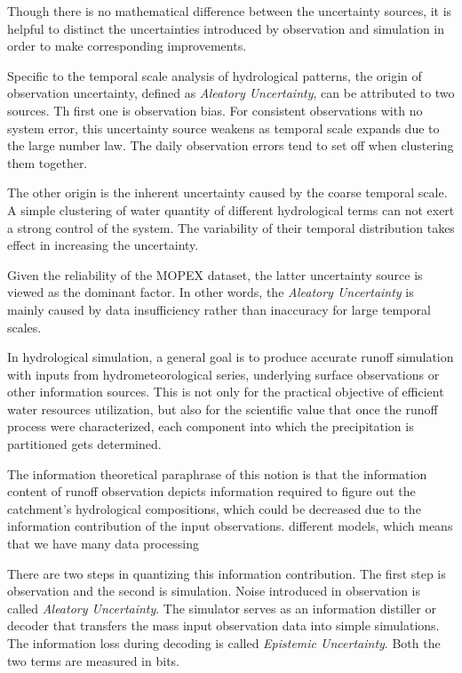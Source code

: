 Though there is no mathematical difference between the 
uncertainty sources, it is helpful to distinct the 
uncertainties introduced by observation and simulation in 
order to make corresponding improvements\citep
{gong2013estimating}. 

Specific to the temporal scale analysis of hydrological 
patterns, the origin of observation uncertainty, defined as 
\emph{Aleatory Uncertainty}, can be attributed to two 
sources. Th first one is  observation bias. For consistent 
observations with no system error, this uncertainty source  
weakens as temporal scale expands  due to the large number 
law. The daily observation errors tend to set off when 
clustering them together. 

The other origin is the inherent uncertainty caused by the 
coarse temporal scale. A simple clustering of water 
quantity of different hydrological terms can not exert a 
strong control of the system. The variability of their 
temporal distribution takes effect in increasing the 
uncertainty. 

Given the reliability of the MOPEX dataset, the latter 
uncertainty source is viewed as the dominant factor. In 
other words, the \emph{Aleatory Uncertainty} is mainly 
caused by data insufficiency rather than inaccuracy for 
large temporal scales.



In hydrological simulation, a general goal is to produce 
accurate runoff simulation with inputs from 
hydrometeorological series, underlying surface observations 
or other information sources. This is not only for the 
practical objective of efficient water resources 
utilization, but also for the scientific value that once 
the runoff process were characterized, each component into 
which the precipitation is partitioned gets determined. 

The information theoretical paraphrase of this notion is 
that the information content of runoff observation depicts 
information required to figure out the catchment's 
hydrological compositions, which could be decreased due to 
the information contribution of the input observations.
different models, which means that we have many data 
processing 

There are two steps in quantizing this information 
contribution. The first step is observation and the second 
is simulation. Noise introduced in observation is called 
\emph{Aleatory Uncertainty}. The simulator serves as an 
information distiller or decoder that transfers the mass 
input observation data into simple simulations. The 
information loss during decoding is called \emph{Epistemic 
Uncertainty}. Both the two terms are measured in bits. 

